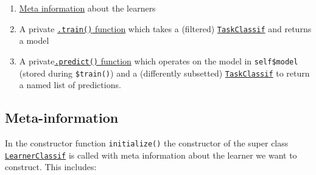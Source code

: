 \documentclass[]{scrbook}
\providecommand{\tightlist}{%
  \setlength{\itemsep}{0pt}\setlength{\parskip}{0pt}}
\begin{document}
\begin{enumerate}
\def\labelenumi{\arabic{enumi}.}
\tightlist
\item
  \protect\hyperlink{learner-meta-information}{Meta information} about the learners
\item
  A private \protect\hyperlink{learner-train}{\texttt{.train()} function} which takes a (filtered) \href{https://mlr3.mlr-org.com/reference/TaskClassif.html}{\texttt{TaskClassif}} and returns a model
\item
  A private\protect\hyperlink{learner-predict}{\texttt{.predict()} function} which operates on the model in \texttt{self\$model} (stored during \texttt{\$train()}) and a (differently subsetted) \href{https://mlr3.mlr-org.com/reference/TaskClassif.html}{\texttt{TaskClassif}} to return a named list of predictions.
\end{enumerate}

\hypertarget{learner-meta-information}{%
\subsection{Meta-information}\label{learner-meta-information}}

In the constructor function \texttt{initialize()} the constructor of the super class \href{https://mlr3.mlr-org.com/reference/LearnerClassif.html}{\texttt{LearnerClassif}} is called with meta information about the learner we want to construct.
This includes:
\end{document}
